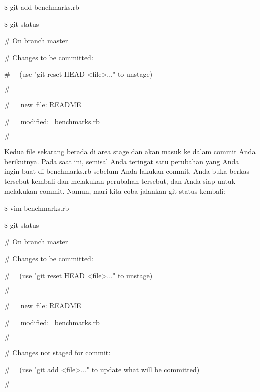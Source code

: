 \vspace{12pt}
\noindent 
 $  \$  $ git add benchmarks.rb \par
\noindent 
 $  \$  $ git status \par
\noindent 
 $  \#  $ On branch master \par
\noindent 
 $  \#  $ Changes to be committed: \par
\noindent 
 $  \#  $~~ (use "git reset HEAD <file>..." to unstage) \par
\noindent 
 $  \#  $ \par
\noindent 
 $  \#  $~~~new~file:   README \par
\noindent 
 $  \#  $~~~modified:~  benchmarks.rb \par
\noindent 
 $  \#  $ \par
\vspace{12pt}
\vspace{12pt}
\vspace{12pt}
\noindent 
Kedua file sekarang berada di area stage dan akan masuk ke dalam commit Anda berikutnya. Pada saat ini, semisal Anda teringat satu perubahan yang Anda ingin buat di benchmarks.rb sebelum Anda lakukan commit. Anda buka berkas tersebut kembali dan melakukan perubahan tersebut, dan Anda siap untuk melakukan commit. Namun, mari kita coba jalankan git status kembali: \par
\vspace{12pt}
\vspace{12pt}
\vspace{12pt}
\noindent 
 $  \$  $ vim benchmarks.rb  \par
\noindent 
 $  \$  $ git status \par
\noindent 
 $  \#  $ On branch master \par
\noindent 
 $  \#  $ Changes to be committed: \par
\noindent 
 $  \#  $~~ (use "git reset HEAD <file>..." to unstage) \par
\noindent 
 $  \#  $ \par
\noindent 
 $  \#  $~~~new~file:   README \par
\noindent 
 $  \#  $~~~modified:~  benchmarks.rb \par
\noindent 
 $  \#  $ \par
\noindent 
 $  \#  $ Changes not staged for commit: \par
\noindent 
 $  \#  $~~ (use "git add <file>..." to update what will be committed) \par
\noindent 
 $  \#  $ \par

